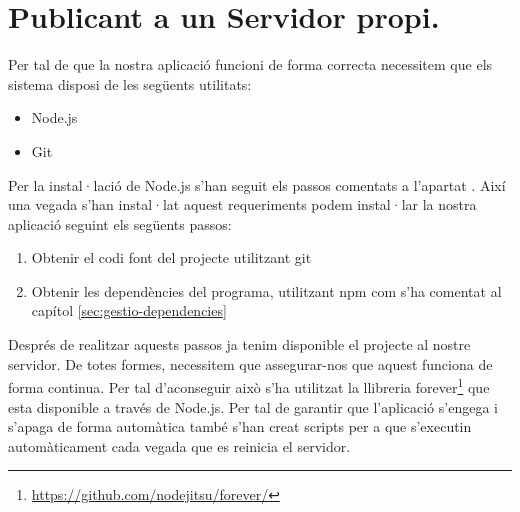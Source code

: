 \section{Publicant a un Servidor propi.}

Per tal de que la nostra aplicació funcioni de forma correcta necessitem que els sistema disposi de les següents utilitats:

\begin{itemize}
\item{Node.js}
\item{Git}
\end{itemize}

Per la instal·lació de Node.js s'han seguit els passos comentats a l'apartat \label{sec:instalacio-Node.js}. Així una vegada s'han instal·lat aquest requeriments podem instal·lar la nostra aplicació seguint els següents passos: 

\begin{enumerate}
\item{Obtenir el codi font del projecte utilitzant git}
\item{Obtenir les dependències del programa, utilitzant npm com s'ha comentat al capítol \ref{sec:gestio-dependencies}}
\end{enumerate}

Després de realitzar aquests passos ja tenim disponible el projecte al nostre servidor. De totes formes, necessitem que assegurar-nos que aquest funciona de forma continua. Per tal d'aconseguir això s'ha utilitzat la llibreria forever\footnote{\url{https://github.com/nodejitsu/forever/}} que esta disponible a través de Node.js. Per tal de garantir que l'aplicació s'engega i s'apaga de forma automàtica també s'han creat scripts per a que s'executin automàticament cada vegada que es reinicia el servidor.

